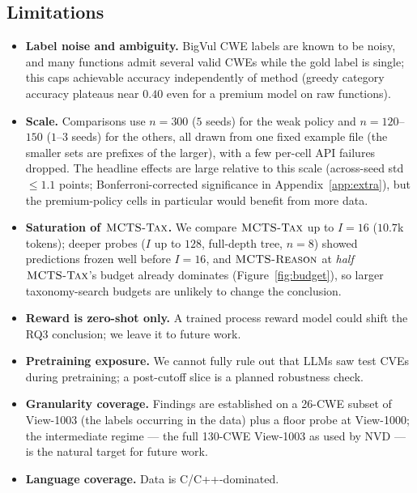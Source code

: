 \subsection{Limitations}
\label{sec:limitations}
\begin{itemize}
\item \textbf{Label noise and ambiguity.} BigVul CWE labels are known to be noisy,
and many functions admit several valid CWEs while the gold label is single; this
caps achievable accuracy independently of method (greedy category accuracy plateaus
near $0.40$ even for a premium model on raw functions).
\item \textbf{Scale.} Comparisons use $n{=}300$ ($5$ seeds) for the weak policy
and $n{=}120$--$150$ ($1$--$3$ seeds) for the others, all drawn from one fixed
example file (the smaller sets are prefixes of the larger), with a few per-cell
API failures dropped. The headline effects are large relative to this scale
(across-seed std $\le 1.1$ points; Bonferroni-corrected significance in
Appendix~\ref{app:extra}), but the premium-policy cells in particular would
benefit from more data.
\item \textbf{Saturation of $\textsc{MCTS-Tax}$.} We compare $\textsc{MCTS-Tax}$ up to $I{=}16$
($10.7$k tokens); deeper probes ($I$ up to $128$, full-depth tree, $n{=}8$)
showed predictions frozen well before $I{=}16$, and $\textsc{MCTS-Reason}$ at \emph{half}
$\textsc{MCTS-Tax}$'s budget already dominates
(Figure~\ref{fig:budget}), so larger taxonomy-search budgets are unlikely to
change the conclusion.
\item \textbf{Reward is zero-shot only.} A trained process reward model could shift
the RQ3 conclusion; we leave it to future work.
\item \textbf{Pretraining exposure.} We cannot fully rule out that LLMs saw test
CVEs during pretraining; a post-cutoff slice is a planned robustness check.
\item \textbf{Granularity coverage.} Findings are established on a 26-CWE
subset of View-1003 (the labels occurring in the data) plus a floor probe at
View-1000; the intermediate regime --- the full 130-CWE View-1003 as used by
NVD --- is the natural target for future work.
\item \textbf{Language coverage.} Data is C/C++-dominated.
\end{itemize}

